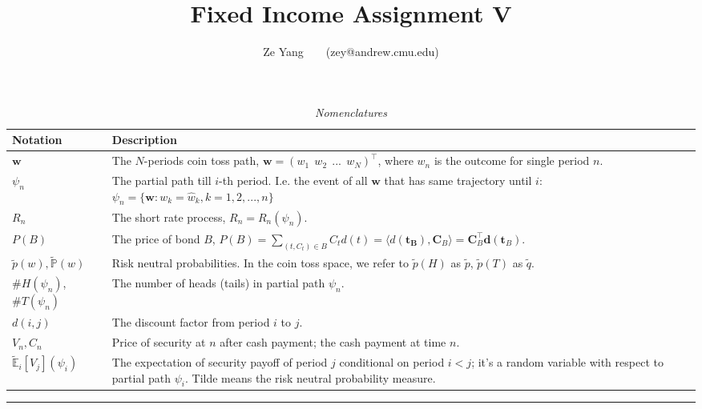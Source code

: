 \documentclass[a4paper, 10pt]{article}
\title{\textbf{Fixed Income Assignment V}}
\author{Ze Yang~~~~(zey@andrew.cmu.edu)}
\renewcommand{\arraystretch}{1.4}
\theoremstyle{definition}
\theoremstyle{hSol}
\begin{document}
\maketitle


\begin{table}[h]
\vspace{-10pt}
\caption{\textit{Nomenclatures}}
\vspace{3pt}
\centering
\def\arraystretch{1.15}
\begin{tabular}{lL}
\hline
Notation & \hspace{4.6cm} Description \\ 
\hline
$\bm{w}$ & The $N$-periods coin toss path, $\bm{w} = (w_1~~w_2~~...~~w_N)^{\top}$, where $w_n$ is the outcome for single period $n$.\\
$\psi_n$ & The partial path till $i$-th period. I.e. the event of all $\bm{w}$ that has same trajectory until $i$: $\psi_n=\{\bm{w}: w_k=\hat{w}_k, k =1,2,...,n\}$\\
$R_n$ & The short rate process, $R_n = R_n(\psi_n)$. \\
$P(B)$ & The price of bond $B$, $P(B)=\sum_{(t,C_t) \in B}C_td(t)=\langle d(\bm{t_B}), \bm{C}_B \rangle = \bm{C}_B^{\top}\bm{d}(\bm{t}_B)$.  \\
$\tilde{p}(w), \tilde{\mathbb{P}}\left(w\right)$ & Risk neutral probabilities. In the coin toss space, we refer to $\tilde{p}(H)$ as $\tilde{p}$, $\tilde{p}(T)$ as $\tilde{q}$.\\
$\#H(\psi_n)$, $\#T(\psi_n)$ & The number of heads (tails) in partial path $\psi_n$. \\
$d(i, j)$ & The discount factor from period $i$ to $j$. \\
$V_n, C_n$ & Price of security at $n$ after cash payment; the cash payment at time $n$.\\
$\tilde{\mathbb{E}}_i\left[V_{j}\right](\psi_i)$ & The expectation of security payoff of period $j$ conditional on period $i<j$; it's a random variable with respect to partial path $\psi_i$. Tilde means the risk neutral probability measure.\\
\hline 
\end{tabular}
\label{tab:Nomen}
\end{table}




\noindent\rule{16cm}{0.4pt}
\end{document}
